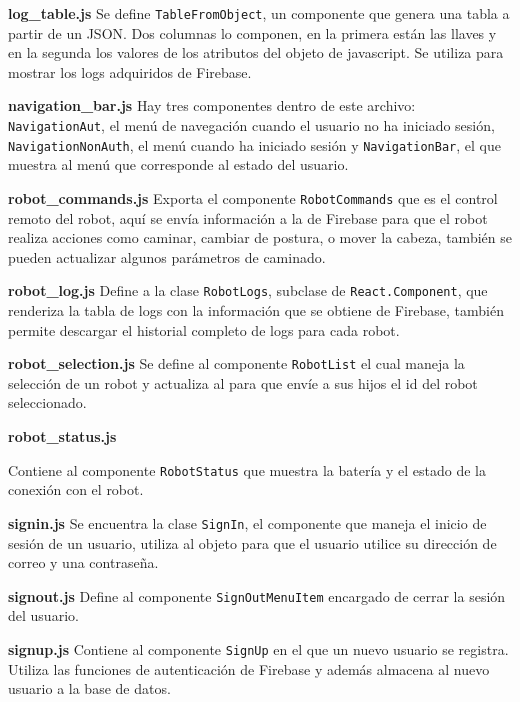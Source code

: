 \textbf{log\_table.js}
\label{\detokenize{code_docs:log-table-js}}
Se define \texttt{TableFromObject}, un componente que genera una tabla a partir de un JSON. Dos columnas lo
componen, en la primera están las llaves y en la segunda los valores de los
atributos del objeto de javascript. Se utiliza para mostrar los logs adquiridos
de Firebase.

\textbf{navigation\_bar.js}
\label{\detokenize{code_docs:navigation-bar-js}}
Hay tres componentes dentro de este archivo:
\texttt{NavigationAut}, el menú de navegación cuando el
usuario no ha iniciado sesión,
\texttt{NavigationNonAuth}, el menú cuando ha iniciado sesión y
\texttt{NavigationBar}, 
el que muestra al menú que corresponde al estado del usuario.


\textbf{robot\_commands.js}
\label{\detokenize{code_docs:robot-commands-js}}
Exporta el componente \texttt{RobotCommands} que es el control remoto del robot, aquí se envía información a la
de Firebase para que el robot realiza acciones como caminar, cambiar de postura,
o mover la cabeza, también se pueden actualizar algunos parámetros de caminado.

\textbf{robot\_log.js}
\label{\detokenize{code_docs:robot-log-js}}
Define a la clase \texttt{RobotLogs}, subclase de \texttt{React.Component}, que renderiza la tabla de logs con la información que se obtiene de
Firebase, también permite descargar el historial completo de logs para cada
robot.


\textbf{robot\_selection.js}
\label{\detokenize{code_docs:robot-selection-js}}
Se define al componente \texttt{RobotList} el cual maneja la selección de un robot y actualiza al
 para que envíe a sus hijos el id del robot seleccionado.

\textbf{robot\_status.js}

Contiene al componente \texttt{RobotStatus} que muestra la batería y el estado de la conexión con el robot.

\textbf{signin.js}
\label{\detokenize{code_docs:signin-js}}
Se encuentra la clase \texttt{SignIn}, el componente que maneja el inicio de sesión de un usuario, utiliza al
objeto  para que el usuario utilice su dirección de correo y una
contraseña.


\textbf{signout.js}
\label{\detokenize{code_docs:signout-js}}
Define al componente \texttt{SignOutMenuItem} encargado de cerrar la sesión del usuario.


\textbf{signup.js}
\label{\detokenize{code_docs:signup-js}}
Contiene al componente \texttt{SignUp} en el que un nuevo usuario se registra. Utiliza las funciones
de autenticación de Firebase y además almacena al nuevo usuario a la base de
datos.

